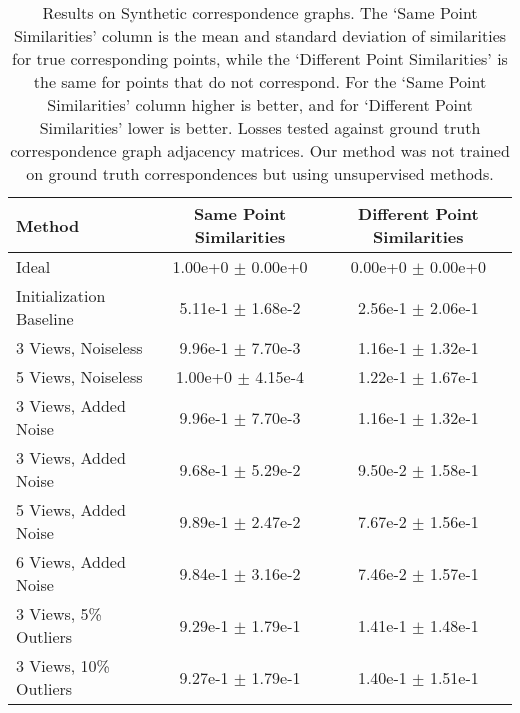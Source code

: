 \documentclass[10pt,twocolumn,letterpaper]{article}
\begin{document}
\begin{table*}
\begin{center}
\begin{tabular}{|l|c|c|}
\hline
Method & Same Point Similarities & Different Point Similarities  \\
\hline\hline\hline
Ideal                              & 1.00e+0 $\pm$ 0.00e+0 & 0.00e+0 $\pm$ 0.00e+0 \\ \hline
Initialization Baseline            & 5.11e-1 $\pm$ 1.68e-2 & 2.56e-1 $\pm$ 2.06e-1 \\ \hline
3 Views, Noiseless                 & 9.96e-1 $\pm$ 7.70e-3 & 1.16e-1 $\pm$ 1.32e-1 \\ \hline
5 Views, Noiseless                 & 1.00e+0 $\pm$ 4.15e-4 & 1.22e-1 $\pm$ 1.67e-1 \\ \hline
3 Views, Added Noise               & 9.96e-1 $\pm$ 7.70e-3 & 1.16e-1 $\pm$ 1.32e-1 \\ \hline
3 Views, Added Noise               & 9.68e-1 $\pm$ 5.29e-2 & 9.50e-2 $\pm$ 1.58e-1 \\ \hline
5 Views, Added Noise               & 9.89e-1 $\pm$ 2.47e-2 & 7.67e-2 $\pm$ 1.56e-1 \\ \hline
6 Views, Added Noise               & 9.84e-1 $\pm$ 3.16e-2 & 7.46e-2 $\pm$ 1.57e-1 \\ \hline
3 Views, 5\% Outliers              & 9.29e-1 $\pm$ 1.79e-1 & 1.41e-1 $\pm$ 1.48e-1 \\ \hline
3 Views, 10\% Outliers             & 9.27e-1 $\pm$ 1.79e-1 & 1.40e-1 $\pm$ 1.51e-1 \\ \hline

\hline
\end{tabular}
\end{center}
\caption{
Results on Synthetic correspondence graphs.
The `Same Point Similarities' column is the mean and standard deviation of similarities for true corresponding points, while the `Different Point Similarities' is the same for points that do not correspond.
For the `Same Point Similarities' column higher is better, and for `Different Point Similarities' lower is better.
Losses tested against ground truth correspondence graph adjacency matrices.
Our method was not trained on ground truth correspondences but using unsupervised methods.
}
\label{fig:synthtable}
\end{table*}
\end{document}
